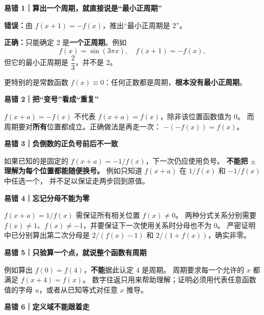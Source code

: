 \clearpage
\begin{trapbox}
\textbf{易错 1｜算出一个周期，就直接说是“最小正周期”}



\textbf{错误：}由 $f(x+1)=-f(x)$，推出“最小正周期是 $2$”。

\textbf{正确：}只能确定 $2$ 是\textbf{一个正周期}。例如
\[
 f(x)=\sin(3\pi x),\quad f(x+1)=-f(x),
\]
但它的最小正周期是 $\dfrac23$，并不是 $2$。

更特别的是常数函数 $f(x)\equiv0$：任何正数都是周期，\textbf{根本没有最小正周期}。

\medskip
\end{trapbox}\clearpage\begin{trapbox}\textbf{易错 2｜把“变号”看成“重复”}



$f(x+a)=-f(x)$ 不代表 $f(x+a)=f(x)$，除非该位置函数值为 $0$。
而周期要对\textbf{所有}位置都成立。正确做法是再走一次：
$-(-f(x))=f(x)$。

\medskip
\end{trapbox}\clearpage\begin{trapbox}\textbf{易错 3｜负倒数的正负号前后不一致}



如果已知的是固定的 $f(x+a)=-1/f(x)$，下一次仍应使用负号。
\textbf{不能把 $\pm$ 理解为每个位置都能随便换号。}
例如只知道 $f(x+a)$ 在 $1/f(x)$ 和 $-1/f(x)$ 中任选一个，
并不足以保证走两步回到原值。

\medskip
\end{trapbox}\clearpage\begin{trapbox}\textbf{易错 4｜忘记分母不能为零}



$f(x+a)=1/f(x)$ 需保证所有相关位置 $f(x)\ne0$。
两种分式关系分别需要 $f(x)\ne1$、$f(x)\ne-1$，并要保证下一次使用关系时分母也不为 $0$。
严密证明中已分别算出第二次分母是 $2/(f(x)-1)$ 和 $2/(1+f(x))$，确实非零。

\end{trapbox}\clearpage\begin{trapbox}\textbf{易错 5｜只验算一个点，就说整个函数有周期}



例如算出 $f(0)=f(4)$，\textbf{不能}据此认定 $4$ 是周期。
周期要求每一个允许的 $x$ 都满足 $f(x+4)=f(x)$。
数字往返只用来帮助理解；证明必须用代表任意函数值的字母 $u$，或者从已知等式对任意 $x$ 推导。

\medskip
\end{trapbox}\clearpage\begin{trapbox}\textbf{易错 6｜定义域不能跟着走}




\end{trapbox}
